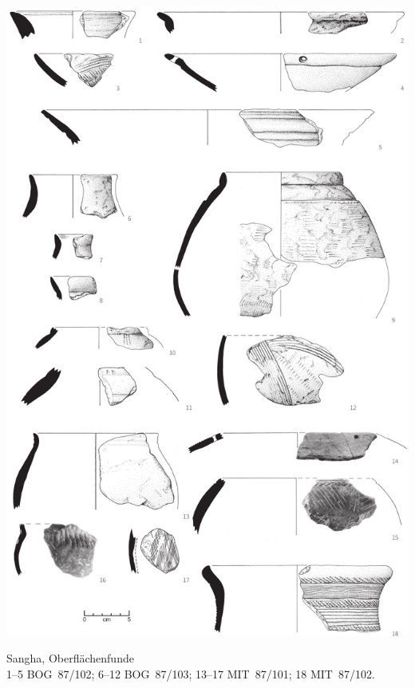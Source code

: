 \begin{pl}[H]
	\includegraphics{plt/Taf41.pdf}
	\vspace{.75em}\caption{\mbox{Sangha}, Oberflächenfunde \\ 1--5 BOG~87/102; 6--12 BOG~87/103; 13--17 MIT~87/101; 18 MIT~87/102.}
	\label{pl:41}
\end{pl}

